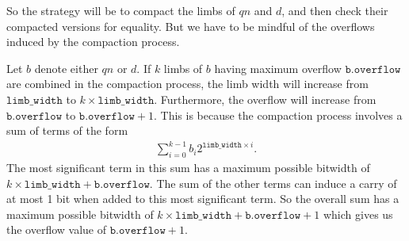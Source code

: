 \documentclass[a4paper, 12pt]{article}
\begin{document}
So the strategy will be to compact the limbs of $qn$ and $d$, and then check their compacted versions for equality. But we have to be mindful of the overflows induced by the compaction process.

Let $b$ denote either $qn$ or $d$. If $k$ limbs of $b$ having maximum overflow $\texttt{b.overflow}$ are combined in the compaction process, the limb width will increase from $\texttt{limb\_width}$ to $k \times \texttt{limb\_width}$. 
Furthermore, the overflow will increase from $\texttt{b.overflow}$ to $\texttt{b.overflow} + 1$. This is because the compaction process involves a sum of terms of the form
\begin{align*}
  \sum_{i=0}^{k-1} b_i 2^{\texttt{limb\_width} \times i}.
\end{align*}
The most significant term in this sum has a maximum possible bitwidth of $k\times \texttt{limb\_width} + \texttt{b.overflow}$. The sum of the other terms can induce a carry of at most 1 bit when added to this most significant term. So the overall sum has a maximum possible bitwidth of $k\times \texttt{limb\_width} + \texttt{b.overflow}+1$ which gives us the overflow value of $\texttt{b.overflow} + 1$.
\end{document}
